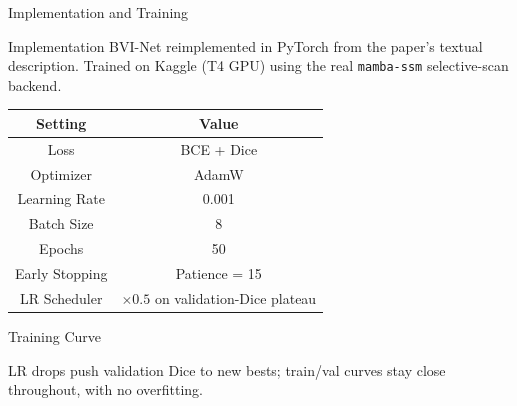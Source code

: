 \documentclass[11pt]{beamer}
\begin{document}
\begin{frame}{Implementation and Training}
    \begin{block}{Implementation}
    BVI-Net reimplemented in PyTorch from the paper's textual description.
    Trained on Kaggle (T4 GPU) using the real \texttt{mamba-ssm}
    selective-scan backend.
    \end{block}

    \bigskip

    \begin{table}
        \centering
        \begin{tabular}{c|c}
            \hline
            \textbf{Setting} & \textbf{Value} \\ \hline
            Loss           & BCE + Dice \\ \hline
            Optimizer      & AdamW \\ \hline
            Learning Rate  & 0.001 \\ \hline
            Batch Size     & 8 \\ \hline
            Epochs         & 50 \\ \hline
            Early Stopping & Patience = 15 \\ \hline
            LR Scheduler   & $\times 0.5$ on validation-Dice plateau \\ \hline
        \end{tabular}
    \end{table}
\end{frame}

\begin{frame}{Training Curve}
    \begin{center}
    \end{center}
    {\footnotesize LR drops push validation Dice to new bests; train/val
    curves stay close throughout, with no overfitting.}
\end{frame}
\end{document}
